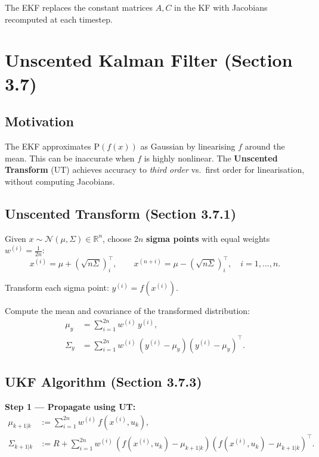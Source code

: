\documentclass[12pt, a4paper]{article}
\begin{document}
The EKF replaces the constant matrices $A,C$ in the KF with Jacobians
recomputed at each timestep.

\section{Unscented Kalman Filter (Section 3.7)}

\subsection{Motivation}

The EKF approximates $\mathrm{P}(f(x))$ as Gaussian by linearising $f$
around the mean. This can be inaccurate when $f$ is highly nonlinear.
The \textbf{Unscented Transform} (UT) achieves accuracy to \emph{third
order} vs.\ first order for linearisation, without computing Jacobians.

\subsection{Unscented Transform (Section 3.7.1)}

Given $x\sim\mathcal{N}(\mu,\Sigma)\in\mathbb{R}^n$, choose $2n$
\textbf{sigma points} with equal weights $w^{(i)}=\frac{1}{2n}$:
\begin{equation}
  x^{(i)} = \mu + (\sqrt{n\Sigma})_i^\top, \qquad
  x^{(n+i)} = \mu - (\sqrt{n\Sigma})_i^\top, \quad i=1,\ldots,n.
  \label{eq:sigma_pts}
\end{equation}

Transform each sigma point: $y^{(i)}=f(x^{(i)})$.

Compute the mean and covariance of the transformed distribution:
\begin{align}
  \mu_y &= \sum_{i=1}^{2n} w^{(i)}\,y^{(i)}, \\
  \Sigma_y &= \sum_{i=1}^{2n} w^{(i)}\,(y^{(i)}-\mu_y)(y^{(i)}-\mu_y)^\top.
  \label{eq:UT}
\end{align}

\subsection{UKF Algorithm (Section 3.7.3)}

\textbf{Step 1 --- Propagate using UT:}
\begin{align}
  \mu_{k+1|k} &:= \sum_{i=1}^{2n} w^{(i)}\,f(x^{(i)},u_k), \\
  \Sigma_{k+1|k} &:= R + \sum_{i=1}^{2n} w^{(i)}\,(f(x^{(i)},u_k)-\mu_{k+1|k})(f(x^{(i)},u_k)-\mu_{k+1|k})^\top.
\end{align}
\end{document}
